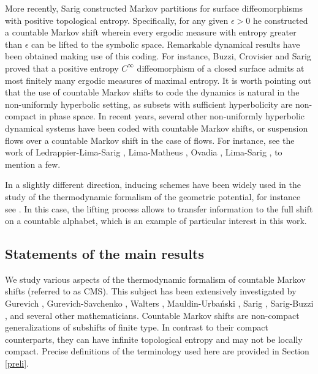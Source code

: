 \documentclass[letterpaper,11pt]{amsart}
\theoremstyle{plain}
\theoremstyle{plain}
\theoremstyle{definition}
\theoremstyle{remark}
\def\e{\epsilon}
\begin{document}
More recently, Sarig \cite{sa4} constructed Markov partitions for surface diffeomorphisms with positive topological entropy. Specifically, for any given $\e>0$ he constructed a countable Markov shift wherein every ergodic measure with entropy greater than $\e$ can be lifted to the symbolic space. Remarkable dynamical results have been obtained making use of this coding. For instance, Buzzi, Crovisier and Sarig \cite{bcs} proved that a positive entropy $C^\infty$ diffeomorphism of a closed surface admits at most finitely many ergodic measures of maximal entropy. It is worth pointing out that the use of countable Markov shifts to code the dynamics is natural in the non-uniformly hyperbolic setting, as subsets with sufficient hyperbolicity are non-compact in phase space. In recent years, several other non-uniformly hyperbolic dynamical systems have been coded with countable Markov shifts, or suspension flows over a countable Markov shift in the case of flows. For instance, see the work of Ledrappier-Lima-Sarig \cite{lls},  Lima-Matheus \cite{lm}, Ovadia \cite{o}, Lima-Sarig \cite{ls}, to mention a few.

In a slightly different direction, inducing schemes have been widely used in the study of the thermodynamic formalism of the geometric potential, for instance see \cite{y, ps, bt}. In this case, the lifting process allows to transfer information to the full shift on a countable alphabet, which is an example of particular interest in this work.

\subsection{Statements of the main results} We study various aspects of the thermodynamic formalism of countable Markov shifts (referred to as CMS). This subject has been extensively investigated by Gurevich \cite{gu}, Gurevich-Savchenko \cite{gs}, Walters \cite{wa}, Mauldin-Urba\'nski \cite{mu1}, Sarig \cite{sa1, sa2, sa3}, Sarig-Buzzi \cite{bs}, and several other mathematicians. Countable Markov shifts are non-compact generalizations of subshifts of finite type.  In contrast to their compact counterparts, they can have infinite topological entropy and may not be locally compact. Precise definitions of the terminology used here are provided in Section \ref{preli}.
\end{document}
